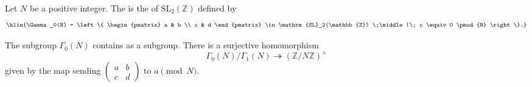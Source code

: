 \begin{definition} \label{definition:gamma_0_N_subgroup_of_SL_2_Z}
    Let $N$ be a positive integer. The  is the  of $\mathrm{SL}_2(\mathbb{Z})$ defined by
    $$\hlin{\Gamma_0(N) = \left\{ \begin{pmatrix} a & b \\ c & d \end{pmatrix} \in \mathrm{SL}_2(\mathbb{Z}) \;\middle|\; c \equiv 0 \pmod{N} \right\}.}$$

    The subgroup $\Gamma_0(N)$ contains  as a subgroup. There is a surjective homomorphism
    $$\Gamma_0(N) / \Gamma_1(N) \twoheadrightarrow (\mathbb{Z}/N\mathbb{Z})^\times$$
    given by the map sending $\begin{pmatrix} a & b \\ c & d \end{pmatrix}$ to $a \pmod{N}$.


\end{definition}
